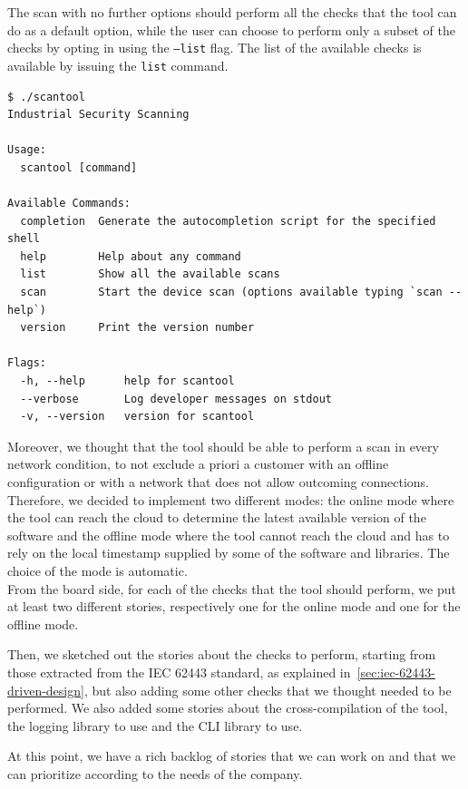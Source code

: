 The scan with no further options should perform all the checks that the tool can do as a default option, while the user can choose to perform only a subset of the checks by opting in using the \texttt{--list} flag. The list of the available checks is available by issuing the \texttt{list} command.

\noindent\begin{minipage}{\linewidth}
  \vspace{0.5cm}
  \begin{lstlisting}[caption={Man page}]
$ ./scantool
Industrial Security Scanning

Usage:
  scantool [command]

Available Commands:
  completion  Generate the autocompletion script for the specified shell
  help        Help about any command
  list        Show all the available scans
  scan        Start the device scan (options available typing `scan --help`)
  version     Print the version number

Flags:
  -h, --help      help for scantool
  --verbose       Log developer messages on stdout
  -v, --version   version for scantool
\end{lstlisting}
\end{minipage}

Moreover, we thought that the tool should be able to perform a scan in every network condition, to not exclude a priori a customer with an offline configuration or with a network that does not allow outcoming connections. Therefore, we decided to implement two different modes: the online mode where the tool can reach the cloud to determine the latest available version of the software and the offline mode where the tool cannot reach the cloud and has to rely on the local timestamp supplied by some of the software and libraries. The choice of the mode is automatic. \\
From the board side, for each of the checks that the tool should perform, we put at least two different stories, respectively one for the online mode and one for the offline mode.

Then, we sketched out the stories about the checks to perform, starting from those extracted from the IEC 62443 standard, as explained in~\cref{sec:iec-62443-driven-design}, but also adding some other checks that we thought needed to be performed. We also added some stories about the cross-compilation of the tool, the logging library to use and the CLI library to use.

At this point, we have a rich backlog of stories that we can work on and that we can prioritize according to the needs of the company.

